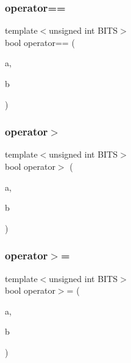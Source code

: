 \mbox{\label{classbase__uint_a977dbbe7e78bbdcc2aea2dc16292d424}} 
\subsubsection{\texorpdfstring{operator==}{operator==}\hspace{0.1cm}{\footnotesize\ttfamily [2/2]}}
{\footnotesize\ttfamily template$<$unsigned int B\+I\+TS$>$ \\
bool operator== (\begin{DoxyParamCaption}\item[{const \mbox{\hyperlink{classbase__uint}{base\+\_\+uint}}$<$ B\+I\+TS $>$ \&}]{a,  }\item[{uint64\+\_\+t}]{b }\end{DoxyParamCaption})\hspace{0.3cm}{\ttfamily [friend]}}

\mbox{\label{classbase__uint_ac59719bd052d5dc2afcc35ae4a8843ab}} 
\subsubsection{\texorpdfstring{operator$>$}{operator>}}
{\footnotesize\ttfamily template$<$unsigned int B\+I\+TS$>$ \\
bool operator$>$ (\begin{DoxyParamCaption}\item[{const \mbox{\hyperlink{classbase__uint}{base\+\_\+uint}}$<$ B\+I\+TS $>$ \&}]{a,  }\item[{const \mbox{\hyperlink{classbase__uint}{base\+\_\+uint}}$<$ B\+I\+TS $>$ \&}]{b }\end{DoxyParamCaption})\hspace{0.3cm}{\ttfamily [friend]}}

\mbox{\label{classbase__uint_a9eb243df5a6dfa3d0cd326427d99bfa6}} 
\subsubsection{\texorpdfstring{operator$>$=}{operator>=}}
{\footnotesize\ttfamily template$<$unsigned int B\+I\+TS$>$ \\
bool operator$>$= (\begin{DoxyParamCaption}\item[{const \mbox{\hyperlink{classbase__uint}{base\+\_\+uint}}$<$ B\+I\+TS $>$ \&}]{a,  }\item[{const \mbox{\hyperlink{classbase__uint}{base\+\_\+uint}}$<$ B\+I\+TS $>$ \&}]{b }\end{DoxyParamCaption})\hspace{0.3cm}{\ttfamily [friend]}}

